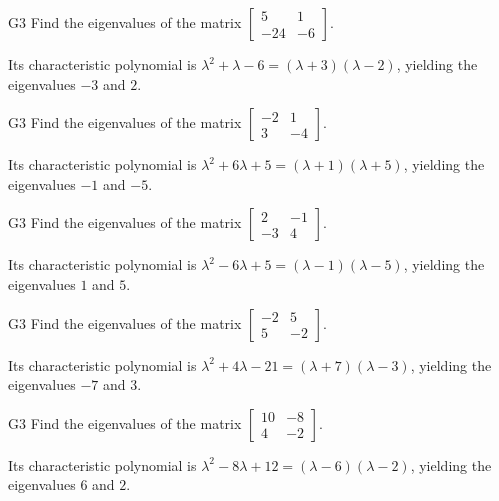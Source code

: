 \begin{problem}{G3}
Find the eigenvalues of the matrix \(\begin{bmatrix} 5 & 1 \\ -24 & -6\end{bmatrix}\).
\end{problem}
\begin{solution}
Its characteristic polynomial is \(\lambda^2+\lambda-6=(\lambda+3)(\lambda-2)\), yielding the eigenvalues \(-3\) and \(2\).
\end{solution}

\begin{problem}{G3}
Find the eigenvalues of the matrix \(\begin{bmatrix} -2 & 1 \\ 3 & -4\end{bmatrix}\).
\end{problem}
\begin{solution}
Its characteristic polynomial is \(\lambda^2+6\lambda+5=(\lambda+1)(\lambda+5)\), yielding the eigenvalues \(-1\) and \(-5\).
\end{solution}

\begin{problem}{G3}
Find the eigenvalues of the matrix \(\begin{bmatrix} 2 & -1 \\ -3 & 4\end{bmatrix}\).
\end{problem}
\begin{solution}
Its characteristic polynomial is \(\lambda^2-6\lambda+5=(\lambda-1)(\lambda-5)\), yielding the eigenvalues \(1\) and \(5\).
\end{solution}

\begin{problem}{G3}
Find the eigenvalues of the matrix \(\begin{bmatrix} -2 & 5 \\ 5 & -2\end{bmatrix}\).
\end{problem}
\begin{solution}
Its characteristic polynomial is \(\lambda^2+4\lambda-21=(\lambda+7)(\lambda-3)\), yielding the eigenvalues \(-7\) and \(3\).
\end{solution}

\begin{problem}{G3}
Find the eigenvalues of the matrix \(\begin{bmatrix} 10 & -8 \\ 4 & -2\end{bmatrix}\).
\end{problem}
\begin{solution}
Its characteristic polynomial is \(\lambda^2-8\lambda+12=(\lambda-6)(\lambda-2)\), yielding the eigenvalues \(6\) and \(2\).
\end{solution}

